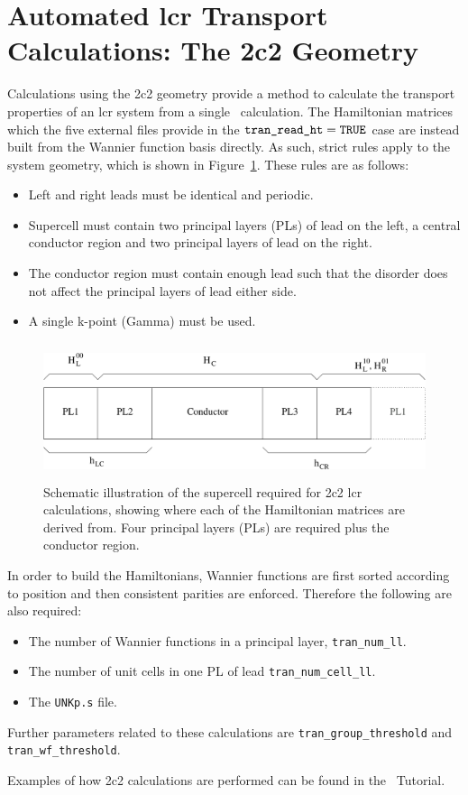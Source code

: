 \section{Automated lcr Transport Calculations: The 2c2 Geometry}
\label{sec:2c2}

Calculations using the 2c2 geometry provide a method to calculate the
transport properties of an lcr system from a single \wannier\ calculation.
The Hamiltonian matrices which the five external files provide in the 
$\verb#tran_read_ht#=\verb#TRUE#$ case are instead built from the 
Wannier function basis directly. As such, strict rules apply to the system geometry, 
which is shown in Figure~\ref{fig:2c2}. These rules are as follows:
\begin{itemize}
\item Left and right leads must be identical and periodic.
\item Supercell must contain two principal layers (PLs) of lead on the left,
a central conductor region and two principal layers of lead on the right.
\item The conductor region must contain enough lead such that the
disorder does not affect the principal layers of lead either side.
\item A single k-point (Gamma) must be used.
\end{itemize}

\begin{figure}[h]
\centering
\includegraphics[height=4cm]{lcr_2c2}
\caption{Schematic illustration of the supercell required for 2c2
lcr calculations, showing where each of the Hamiltonian matrices
are derived from. Four principal layers (PLs) are required plus the
conductor region.}
\label{fig:2c2}
\end{figure}

In order to build the Hamiltonians, Wannier  functions are first 
sorted according to position and then consistent parities are enforced.
Therefore the following are also required:
\begin{itemize}
\item The number of Wannier functions in a principal layer, 
\verb#tran_num_ll#.
\item The number of unit cells in one PL of lead
\verb#tran_num_cell_ll#.
\item The \verb#UNKp.s# file.
\end{itemize}

Further parameters related to these calculations are 
\verb#tran_group_threshold# and \verb#tran_wf_threshold#.

Examples of how 2c2 calculations are performed can be found 
in the \wannier\ Tutorial.
